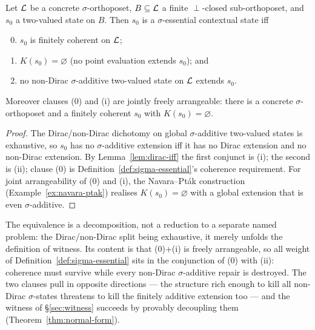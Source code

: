 \begin{theorem}[Localization]\label{thm:localization}
Let $\mathcal{L}$ be a concrete $\sigma$-orthoposet, $B \subseteq \mathcal{L}$ a finite
$\perp$-closed sub-orthoposet, and $s_0$ a two-valued state on $B$. Then $s_0$ is
a $\sigma$-essential contextual state iff
\begin{enumerate}[label=\textup{(\roman*)}, start=0]
  \setcounter{enumi}{-1}
  \item[\textup{(0)}] $s_0$ is finitely coherent on $\mathcal{L}$;
  \item $K(s_0) = \varnothing$ (no point evaluation extends $s_0$); and
  \item no non-Dirac $\sigma$-additive two-valued state on $\mathcal{L}$ extends $s_0$.
\end{enumerate}
Moreover clauses \textup{(0)} and \textup{(i)} are jointly freely arrangeable:
there is a concrete $\sigma$-orthoposet and a finitely coherent $s_0$ with
$K(s_0) = \varnothing$.
\end{theorem}

\begin{proof}
The Dirac/non-Dirac dichotomy on global $\sigma$-additive two-valued states is
exhaustive, so $s_0$ has no $\sigma$-additive extension iff it has no Dirac
extension and no non-Dirac extension. By Lemma~\ref{lem:dirac-iff} the first
conjunct is (i); the second is (ii); clause (0) is Definition~\ref{def:sigma-essential}'s
coherence requirement. For joint arrangeability of (0) and (i), the Navara--Pt\'ak
construction (Example~\ref{ex:navara-ptak}) realises $K(s_0)=\varnothing$ with a
global extension that is even $\sigma$-additive.
\end{proof}

\begin{remark}\label{rem:localization-scope}
The equivalence is a decomposition, not a reduction to a separate named problem:
the Dirac/non-Dirac split being exhaustive, it merely unfolds the definition of
witness. Its content is that (0)+(i) is freely arrangeable, so all weight of
Definition~\ref{def:sigma-essential} sits in the conjunction of (0) with (ii):
coherence must survive while every non-Dirac $\sigma$-additive repair is
destroyed. The two clauses pull in opposite directions --- the structure rich
enough to kill all non-Dirac $\sigma$-states threatens to kill the finitely
additive extension too --- and the witness of \S\ref{sec:witness} succeeds by
provably decoupling them (Theorem~\ref{thm:normal-form}).
\end{remark}

